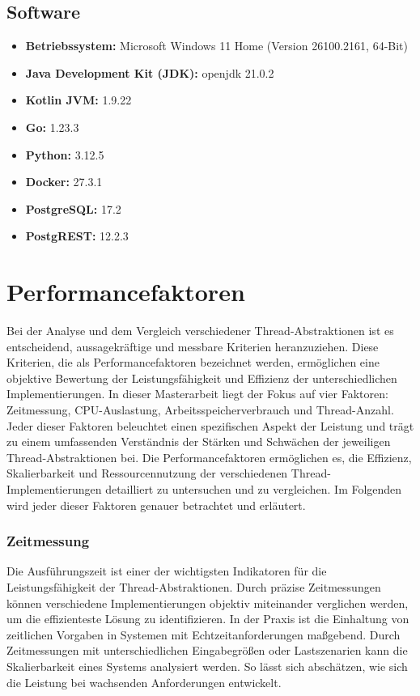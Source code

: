 \documentclass[fontsize=12pt,paper=a4,twoside=semi,parskip=half-,headsepline,headinclude]{scrreprt}
\begin{document}
\subsection{Software}

\begin{itemize}
	\item \textbf{Betriebssystem:} Microsoft Windows 11 Home (Version 26100.2161, 64-Bit)
	\item \textbf{Java Development Kit (JDK):} openjdk 21.0.2
	\item \textbf{Kotlin JVM:} 1.9.22
	\item \textbf{Go:} 1.23.3
	\item \textbf{Python:} 3.12.5
	\item \textbf{Docker:} 27.3.1
	\item \textbf{PostgreSQL:} 17.2
	\item \textbf{PostgREST:} 12.2.3
\end{itemize}

\section{Performancefaktoren}

Bei der Analyse und dem Vergleich verschiedener Thread-Abstraktionen ist es entscheidend, aussagekräftige und messbare Kriterien heranzuziehen. Diese Kriterien, die als Performancefaktoren bezeichnet werden, ermöglichen eine objektive Bewertung der Leistungsfähigkeit und Effizienz der unterschiedlichen Implementierungen. In dieser Masterarbeit liegt der Fokus auf vier Faktoren: Zeitmessung, CPU-Auslastung, Arbeitsspeicherverbrauch und Thread-Anzahl. Jeder dieser Faktoren beleuchtet einen spezifischen Aspekt der Leistung und trägt zu einem umfassenden Verständnis der Stärken und Schwächen der jeweiligen Thread-Abstraktionen bei. Die Performancefaktoren ermöglichen es, die Effizienz, Skalierbarkeit und Ressourcennutzung der verschiedenen Thread-\-Imple\-mentie\-rungen detailliert zu untersuchen und zu vergleichen. Im Folgenden wird jeder dieser Faktoren genauer betrachtet und erläutert.

\subsubsection{Zeitmessung}

Die Ausführungszeit ist einer der wichtigsten Indikatoren für die Leistungsfähigkeit der Thread-Abstraktionen. Durch präzise Zeitmessungen können verschiedene Implementierungen objektiv miteinander verglichen werden, um die effizienteste Lösung zu identifizieren. In der Praxis ist die Einhaltung von zeitlichen Vorgaben in Systemen mit Echtzeitanforderungen maßgebend. Durch Zeitmessungen mit unterschiedlichen Eingabegrößen oder Lastszenarien kann die Skalierbarkeit eines Systems analysiert werden. So lässt sich abschätzen, wie sich die Leistung bei wachsenden Anforderungen entwickelt.
\end{document}
